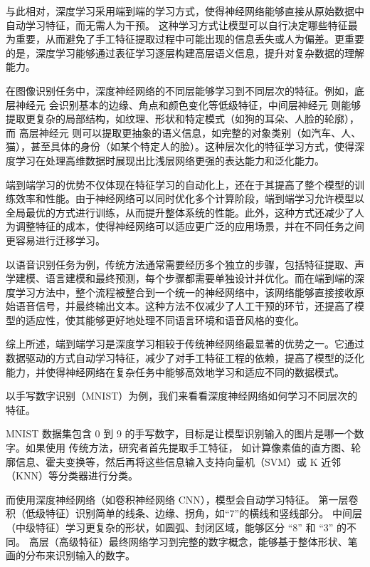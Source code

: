 与此相对，深度学习采用端到端的学习方式，使得神经网络能够直接从原始数据中自动学习特征，而无需人为干预。 这种学习方式让模型可以自行决定哪些特征最为重要，从而避免了手工特征提取过程中可能出现的信息丢失或人为偏差。更重要的是，深度学习能够通过表征学习逐层构建高层语义信息，提升对复杂数据的理解能力。

在图像识别任务中，深度神经网络的不同层能够学习到不同层次的特征。例如，底层神经元 会识别基本的边缘、角点和颜色变化等低级特征，中间层神经元 则能够提取更复杂的局部结构，如纹理、形状和特定模式（如狗的耳朵、人脸的轮廓），而 高层神经元 则可以提取更抽象的语义信息，如完整的对象类别（如汽车、人、猫），甚至具体的身份（如某个特定人的脸）。这种层次化的特征学习方式，使得深度学习在处理高维数据时展现出比浅层网络更强的表达能力和泛化能力。

端到端学习的优势不仅体现在特征学习的自动化上，还在于其提高了整个模型的训练效率和性能。由于神经网络可以同时优化多个计算阶段，端到端学习允许模型以全局最优的方式进行训练，从而提升整体系统的性能。此外，这种方式还减少了人为调整特征的成本，使得神经网络可以适应更广泛的应用场景，并在不同任务之间更容易进行迁移学习。

以语音识别任务为例，传统方法通常需要经历多个独立的步骤，包括特征提取、声学建模、语言建模和最终预测，每个步骤都需要单独设计并优化。而在端到端的深度学习方法中，整个流程被整合到一个统一的神经网络中，该网络能够直接接收原始语音信号，并最终输出文本。这种方法不仅减少了人工干预的环节，还提高了模型的适应性，使其能够更好地处理不同语言环境和语音风格的变化。

综上所述，端到端学习是深度学习相较于传统神经网络最显著的优势之一。它通过数据驱动的方式自动学习特征，减少了对手工特征工程的依赖，提高了模型的泛化能力，并使得神经网络在复杂任务中能够高效地学习和适应不同的数据模式。


以手写数字识别（MNIST）为例，我们来看看深度神经网络如何学习不同层次的特征。

MNIST 数据集包含 0 到 9 的手写数字，目标是让模型识别输入的图片是哪一个数字。如果使用 传统方法，研究者首先提取手工特征， 如计算像素值的直方图、轮廓信息、霍夫变换等，然后再将这些信息输入支持向量机（SVM）或 K 近邻（KNN）等分类器进行分类。

而使用深度神经网络（如卷积神经网络 CNN），模型会自动学习特征。
第一层卷积（低级特征）识别简单的线条、边缘、拐角，如“7”的横线和竖线部分。
中间层（中级特征）学习更复杂的形状，如圆弧、封闭区域，能够区分 “8” 和 “3” 的不同。
高层（高级特征）最终网络学习到完整的数字概念，能够基于整体形状、笔画的分布来识别输入的数字。

